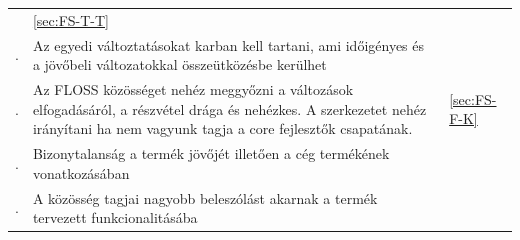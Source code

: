 \documentclass[12pt,magyar,a4paper,oneside]{scrreprt}
\begin{document}
\begin{longtable}[]{@{}lll@{}}
\begin{minipage}[t]{0.49\columnwidth}
\end{minipage} & \begin{minipage}[t]{0.18\columnwidth}\raggedright
\ref{sec:FS-T-T}\strut
\end{minipage}\tabularnewline
\begin{minipage}[t]{0.24\columnwidth}\raggedright
.\strut
\end{minipage} & \begin{minipage}[t]{0.49\columnwidth}\raggedright
Az egyedi változtatásokat karban kell tartani, ami időigényes és a
jövőbeli változatokkal összeütközésbe kerülhet\strut
\end{minipage} & \begin{minipage}[t]{0.18\columnwidth}\raggedright
\strut
\end{minipage}\tabularnewline
\begin{minipage}[t]{0.24\columnwidth}\raggedright
.\strut
\end{minipage} & \begin{minipage}[t]{0.49\columnwidth}\raggedright
Az FLOSS közösséget nehéz meggyőzni a változások elfogadásáról, a
részvétel drága és nehézkes. A szerkezetet nehéz irányítani ha nem
vagyunk tagja a core fejlesztők csapatának.\strut
\end{minipage} & \begin{minipage}[t]{0.18\columnwidth}\raggedright
\ref{sec:FS-F-K}\strut
\end{minipage}\tabularnewline
\begin{minipage}[t]{0.24\columnwidth}\raggedright
.\strut
\end{minipage} & \begin{minipage}[t]{0.49\columnwidth}\raggedright
Bizonytalanság a termék jövőjét illetően a cég termékének
vonatkozásában\strut
\end{minipage} & \begin{minipage}[t]{0.18\columnwidth}\raggedright
\strut
\end{minipage}\tabularnewline
\begin{minipage}[t]{0.24\columnwidth}\raggedright
.\strut
\end{minipage} & \begin{minipage}[t]{0.49\columnwidth}\raggedright
A közösség tagjai nagyobb beleszólást akarnak a termék tervezett
funkcionalitásába\strut
\end{minipage} & \begin{minipage}[t]{0.18\columnwidth}\raggedright
\strut
\end{minipage}\tabularnewline

\end{longtable}
\end{document}
